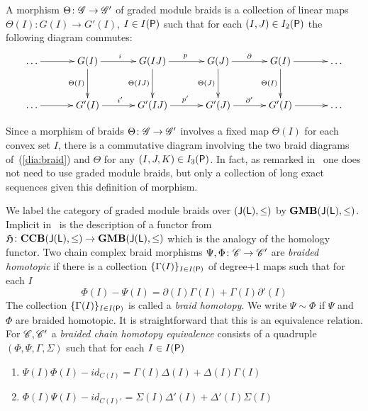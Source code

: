 A morphism $\Theta\colon \mathscr{G}\to \mathscr{G}'$ of graded module braids is a collection of linear maps $\Theta(I)\colon G(I)\to G'(I)$, $I\in I({\mathsf P})$ such that for each $(I,J)\in I_2({\mathsf P})$ the following diagram commutes:
\[
\xymatrixrowsep{0.4in}
\xymatrixcolsep{0.45in}
\xymatrix{
\ldots \ar@{->}[r] & G(I) \ar@{->}[d]_{\Theta(I)} \ar@{->}[r]^{i} & G(IJ) \ar@{->}[d]_{\Theta(IJ)} \ar@{->}[r]^{p} & G(J) \ar@{->}[d]_{\Theta(J)} \ar@{->}[r]^{\partial} & G(I) \ar@{->}[d]_{\Theta(I)} \ar@{->}[r] & \ldots\\
\ldots \ar@{->}[r] & G'(I) \ar@{->}[r]^{i'} & G'(IJ) \ar@{->}[r]^{p'} & G'(J) \ar@{->}[r]^{\partial'} & G'(I) \ar@{->}[r] &\ldots
}
\]

\begin{rem}
Since a morphism of braids $\Theta\colon \mathscr{G}\to \mathscr{G}'$ involves a fixed map $\Theta(I)$ for each convex set $I$,  there is a commutative diagram involving the two braid diagrams of~(\ref{dia:braid}) and $\Theta$ for any $(I,J,K)\in I_3({\mathsf P})$.  In fact, as remarked in~\cite{mcr,bar} one does not need to use graded module braids, but only a collection of long exact sequences given this definition of morphism.
\end{rem}

We label the category of graded module braids over $({\mathsf J}({\mathsf L}),\leq)$ by ${\bf GMB}({\mathsf J}({\mathsf L}),\leq)$.  Implicit in~\cite[Proposition 2.7]{fran} is the description of a functor from $\mathfrak{H}\colon {\bf CCB}({\mathsf J}({\mathsf L}),\leq)\to {\bf GMB}({\mathsf J}({\mathsf L}),\leq)$ which is the analogy of the homology functor.   Two chain complex braid morphisms $\Psi,\Phi\colon \mathscr{C}\to \mathscr{C}'$ are {\em braided homotopic} if there is a collection $\{\Gamma(I)\}_{I\in I({\mathsf P})}$ of degree+1 maps such that for each $I$
\[
\Phi(I)-\Psi(I)=\partial(I)\Gamma(I)+\Gamma(I)\partial'(I)
\] 
The collection $\{\Gamma(I)\}_{I\in I({\mathsf P})}$ is called a {\em braid homotopy}.  We write $\Psi\sim \Phi$ if $\Psi$ and $\Phi$ are braided homotopic.  It is straightforward that this is an equivalence relation.    For $\mathscr{C},\mathscr{C}'$ a {\em braided chain homotopy equivalence} consists of a quadruple  $(\Phi,\Psi,\Gamma,\Sigma)$  such that for each $I\in I({\mathsf P})$
\begin{enumerate}
\item $\Psi(I)\Phi(I) - id_{C(I)} = \Gamma(I)\Delta(I) + \Delta(I) \Gamma(I)$
\item $\Phi(I)\Psi(I) - id_{C(I)'} = \Sigma(I)\Delta'(I) + \Delta'(I)\Sigma(I)$
\end{enumerate}


